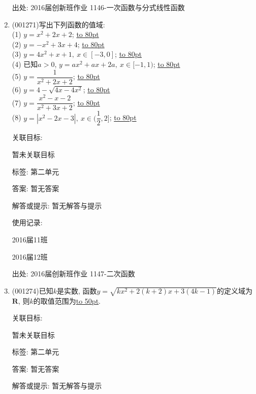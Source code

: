 \documentclass[10pt,a4paper]{article}
\newcommand{\blank}[1]{\underline{\hbox to #1pt{}}}
\begin{document}
\begin{enumerate}[1.]
出处: 2016届创新班作业	1146-一次函数与分式线性函数
\item { (001271)}写出下列函数的值域:\\ 
(1) $y=x^2+2x+2$; \blank{80}\\ 
(2) $y=-x^2+3x+4$; \blank{80}\\ 
(3) $y=4x^2+x+1, \ x \in [-3,0]$; \blank{80}\\ 
(4) 已知$a>0$, $y=ax^2+ax+2a, \ x \in [-1,1)$; \blank{80}\\ 
(5) $y=\dfrac{1}{x^2+2x+2}$; \blank{80}\\ 
(6) $y=4-\sqrt{4x-4x^2}$; \blank{80}\\ 
(7) $y=\dfrac{x^2-x-2}{x^2+3x+2}$; \blank{80}\\ 
(8) $y=|x^2-2x-3|, \ x \in (\dfrac{1}{2},2]$; \blank{80}


关联目标:

暂未关联目标



标签: 第二单元

答案: 暂无答案

解答或提示: 暂无解答与提示

使用记录:

2016届11班								

2016届12班								


出处: 2016届创新班作业	1147-二次函数
\item { (001274)}已知$k$是实数, 函数$y=\sqrt{kx^2+2(k+2)x+3(4k-1)}$的定义域为$\mathbf{R}$, 则$k$的取值范围为\blank{50}.


关联目标:

暂未关联目标



标签: 第二单元

答案: 暂无答案

解答或提示: 暂无解答与提示


\end{enumerate}
\end{document}
